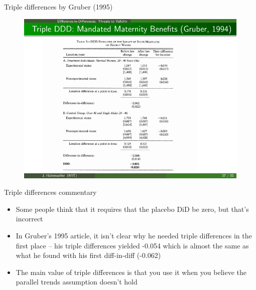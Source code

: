 \documentclass{beamer}
\begin{document}
\begin{frame}{Triple differences by Gruber (1995)}

	\begin{figure}
	\includegraphics{./lecture_includes/gruber_ddd_3.pdf}
	\end{figure}

\end{frame}

\begin{frame}{Triple differences commentary}

\begin{itemize}
\item Some people think that it requires that the placebo DiD be zero, but that's incorrect

\item In Gruber's 1995 article, it isn't clear why he needed triple differences in the first place -- his triple differences yielded -0.054 which is almost the same as what he found with his first diff-in-diff (-0.062)
\item The main value of triple differences is that you use it when you believe the parallel trends assumption doesn't hold

\end{itemize}

\end{frame}
\end{document}
